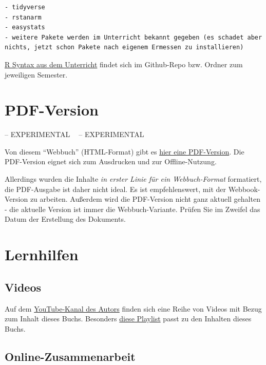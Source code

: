 \documentclass[
  a4paper,
  DIV=11]{scrreprt}
\theoremstyle{definition}
\theoremstyle{remark}
\begin{document}
\begin{verbatim}
- tidyverse
- rstanarm
- easystats
- weitere Pakete werden im Unterricht bekannt gegeben (es schadet aber nichts, jetzt schon Pakete nach eigenem Ermessen zu installieren)
\end{verbatim}

\href{https://github.com/sebastiansauer/Lehre}{R Syntax aus dem
Unterricht} findet sich im Github-Repo bzw. Ordner zum jeweiligen
Semester.

\hypertarget{pdf-version}{%
\section*{PDF-Version}\label{pdf-version}}

-- EXPERIMENTAL 🔬🧪 -- EXPERIMENTAL

Von diesem ``Webbuch'' (HTML-Format) gibt es
\href{_book/Start-Bayes!.pdf}{hier eine PDF-Version}. Die PDF-Version
eignet sich zum Ausdrucken und zur Offline-Nutzung.

Allerdings wurden die Inhalte \emph{in erster Linie für ein
Webbuch-Format} formatiert, die PDF-Ausgabe ist daher nicht ideal. Es
ist empfehlenswert, mit der Webbook-Version zu arbeiten. Außerdem wird
die PDF-Version nicht ganz aktuell gehalten - die aktuelle Version ist
immer die Webbuch-Variante. Prüfen Sie im Zweifel das Datum der
Erstellung des Dokuments.

\hypertarget{lernhilfen}{%
\section*{Lernhilfen}\label{lernhilfen}}

\hypertarget{videos}{%
\subsection*{Videos}\label{videos}}

Auf dem
\href{https://www.youtube.com/channel/UCkvdtj8maE7g-SOCh4aDB9g}{YouTube-Kanal
des Autors} finden sich eine Reihe von Videos mit Bezug zum Inhalt
dieses Buchs. Besonders
\href{https://www.youtube.com/playlist?list=PLRR4REmBgpIGVptiSN-qDVEJKfFnUqDyL}{diese
Playlist} passt zu den Inhalten dieses Buchs.

\hypertarget{online-zusammenarbeit}{%
\subsection*{Online-Zusammenarbeit}\label{online-zusammenarbeit}}
\end{document}
